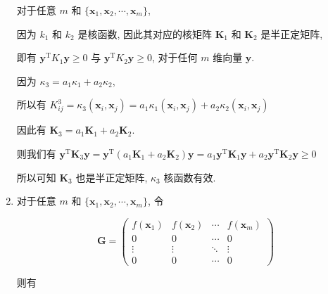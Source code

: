 \documentclass[answers]{exam}  %
\begin{document}
\begin{questions}
\begin{solution}
\begin{enumerate}
            对于任意 $m$ 和 $\{ \bm{x}_1, \bm{x}_2, \cdots, \bm{x}_{m} \}$,

            因为 $k_1$ 和 $k_2$ 是核函数, 因此其对应的核矩阵 $\bm{K}_1$ 和 $\bm{K}_2$ 是半正定矩阵,

            即有 $\bm{y}^{\mathrm{T}} K_1 \bm{y} \ge 0$ 与 $\bm{y}^{\mathrm{T}} K_2 \bm{y} \ge 0$, 对于任何 $m$ 维向量 $\bm{y}$.

            因为 $\kappa_3 = a_1\kappa_1+a_2\kappa_2$,

            所以有 $K_{ij}^{3} = \kappa_3(\bm{x}_i, \bm{x}_j) = a_1\kappa_1(\bm{x}_i, \bm{x}_j) + a_2\kappa_2(\bm{x}_i, \bm{x}_j)$

            因此有 $\bm{K}_3 = a_1\bm{K}_1 + a_2\bm{K}_2$.

            则我们有 $\bm{y}^{\mathrm{T}}\bm{K}_3\bm{y} = \bm{y}^{\mathrm{T}}(a_1\bm{K}_1 + a_2\bm{K}_2)\bm{y} = a_1\bm{y}^{\mathrm{T}}\bm{K}_1\bm{y} + a_2\bm{y}^{\mathrm{T}}\bm{K}_2\bm{y} \ge 0$

            所以可知 $\bm{K}_3$ 也是半正定矩阵, $\kappa_3$ 核函数有效.

      \item

            对于任意 $m$ 和 $\{ \bm{x}_1, \bm{x}_2, \cdots, \bm{x}_{m} \}$, 令

            $$
              \bm{G} = \begin{pmatrix} f(\bm{x}_1) & f(\bm{x}_2) &\cdots& f(\bm{x}_m) \\ 0 & 0 & \cdots & 0 \\ \vdots & \vdots & \ddots & \vdots \\ 0 & 0 & \cdots & 0 \end{pmatrix}
            $$

            则有


\end{enumerate}
\end{solution}
\end{questions}
\end{document}
